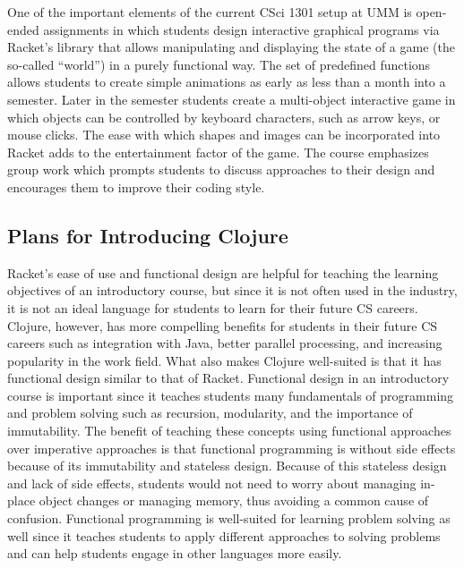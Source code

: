 \documentclass[12pt]{article}
\newcommand{\comment}[1]{}
\newcommand{\emcomment}[1]{\textcolor{ForestGreen}{\comment{Elena: {#1}}}}
\newcommand{\todo}[1]{\textcolor{blue}{\comment{To Do: {#1}}}}
\newcommand{\pscomment}[1]{\textcolor{red}{\comment{Paul: {#1}}}}
\begin{document}
One of the important elements of the current CSci 1301 setup at UMM is open-ended assignments in which students design interactive graphical programs via Racket's library that allows manipulating and displaying the state of a game (the so-called ``world'') in a purely functional way. The set of predefined functions allows students to create simple animations as early as less than a month into a semester. Later in the semester students create a multi-object interactive game in which objects can be controlled by keyboard characters, such as arrow keys, or mouse clicks. The ease with which shapes and images can be incorporated into Racket adds to the entertainment factor of the game. The course emphasizes group work which prompts students to discuss approaches to their design and encourages them to improve their coding style. 



\subsection{Plans for Introducing Clojure}\label{subsec:plans}
Racket's ease of use and functional design are helpful for teaching the learning objectives of an introductory course, but since it is not often used in the industry, it is not an ideal language for students to learn for their future CS careers. Clojure, however, has more compelling benefits for students in their future CS careers such as integration with Java, better parallel processing, and increasing popularity in the work field. What also makes Clojure well-suited is that it has functional design similar to that of Racket. Functional design in an introductory course is important since it teaches students many fundamentals of programming and problem solving such as recursion, modularity, and the importance of immutability. The benefit of teaching these concepts using functional approaches over imperative approaches is that functional programming is without side effects because of its immutability and stateless design. Because of this stateless design and lack of side effects, students would not need to worry about managing in-place object changes or managing memory, thus avoiding a common cause of confusion. Functional programming is well-suited for learning problem solving as well since it teaches students to apply different approaches to solving problems and can help students engage in other languages more easily.
\end{document}
